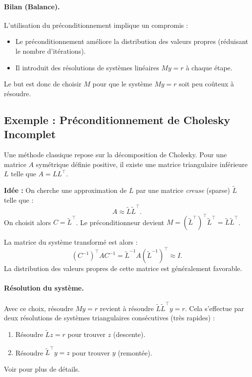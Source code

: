 \paragraph{Bilan (Balance).}
L'utilisation du préconditionnement implique un compromis :
\begin{itemize}
    \item[(+)] Le préconditionnement améliore la distribution des valeurs propres (réduisant le nombre d'itérations).
    \item[(-)] Il introduit des résolutions de systèmes linéaires $M y = r$ à chaque étape.
\end{itemize}
Le but est donc de choisir $M$ pour que le système $M y = r$ soit peu coûteux à résoudre.

\subsection{Exemple : Préconditionnement de Cholesky Incomplet}

Une méthode classique repose sur la décomposition de Cholesky. Pour une matrice $A$ symétrique définie positive, il existe une matrice triangulaire inférieure $L$ telle que $A = L L^\top$.

\textbf{Idée :} On cherche une approximation de $L$ par une matrice \emph{creuse} (sparse) $\tilde{L}$ telle que :
\[
A \approx \tilde{L} \tilde{L}^\top.
\]
On choisit alors $C = \tilde{L}^\top$.
Le préconditionneur devient $M = (\tilde{L}^\top)^\top \tilde{L}^\top = \tilde{L} \tilde{L}^\top$.

La matrice du système transformé est alors :
\[
(C^{-1})^\top A C^{-1} = \tilde{L}^{-1} A (\tilde{L}^{-1})^\top \approx I.
\]
La distribution des valeurs propres de cette matrice est généralement favorable.

\paragraph{Résolution du système.}
Avec ce choix, résoudre $M y = r$ revient à résoudre $\tilde{L} \tilde{L}^\top y = r$. Cela s'effectue par deux résolutions de systèmes triangulaires consécutives (très rapides) :
\begin{enumerate}
    \item Résoudre $\tilde{L} z = r$ pour trouver $z$ (descente).
    \item Résoudre $\tilde{L}^\top y = z$ pour trouver $y$ (remontée).
\end{enumerate}


Voir \cite{langrene2025fast} pour plus de détails.


